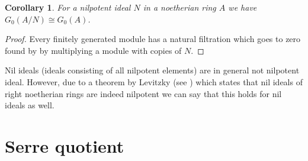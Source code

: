\documentclass[12pt]{report}
\numberwithin{equation}{section}
\newtheorem{definition}[dummy]{Definition}
\newtheorem{corollary}[dummy]{Corollary}
\begin{document}
	\begin{corollary}
		For a nilpotent ideal $N$ in a noetherian ring $A$ we have $G_0(A/N) \cong G_0(A	)$.
	\end{corollary}
	\begin{proof}
		Every finitely generated module has a natural filtration which goes to zero found by by multiplying a module with copies of $N$.
	\end{proof}	
	Nil ideals (ideals consisting of all nilpotent elements) are in general not nilpotent ideal. However, due to a theorem by Levitzky (see \cite[Theorem 10.30]{lam2001first}) which states that nil ideals of right noetherian rings are indeed nilpotent we can say that this holds for nil ideals as well.
	
	
	
	\section{Serre quotient}
\end{document}
